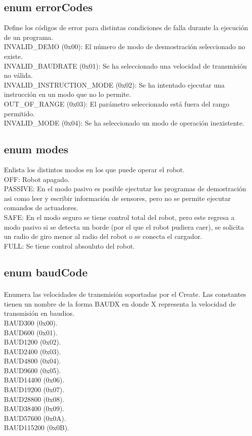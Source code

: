 \documentclass[letterpaper]{book}
\begin{document}
\subsection{enum errorCodes}
Define los códigos de error para distintas condiciones de falla durante la ejecución de un programa.\\
INVALID\_DEMO (0x00): El número de modo de desmostración seleccionado no existe.\\
INVALID\_BAUDRATE (0x01): Se ha seleccionado una velocidad de transmisión no válida.\\
INVALID\_INSTRUCTION\_MODE (0x02): Se ha intentado ejecutar una instrucción en un modo que no lo permite.\\
OUT\_OF\_RANGE (0x03): El parámetro seleccionado está fuera del rango permitido.\\
INVALID\_MODE (0x04): Se ha seleccionado un modo de operación inexistente.\\

\subsection{enum modes}
Enlista los distintos modos en los que puede operar el robot.\\
OFF: Robot apagado.\\
PASSIVE: En el modo pasivo es posible ejectutar los programas de demostración asi como leer y escribir información de sensores, pero no se permite ejecutar comandos de actuadores.\\
SAFE: En el modo seguro se tiene control total del robot, pero este regresa a modo pasivo si se detecta un borde (por el que el robot pudiera caer), se solicita un radio de giro menor al radio del robot o se conecta el cargador.\\
FULL: Se tiene control absouluto del robot.\\
\subsection{enum baudCode}
Enumera las velocidades de transmisión soportadas por el Create\textsuperscript{\textregistered}. Las constantes tienen un nombre de la forma BAUDX en donde X representa la velocidad de transmisión en baudios.\\
BAUD300 (0x00).\\
BAUD600 (0x01).\\
BAUD1200 (0x02).\\
BAUD2400 (0x03).\\
BAUD4800 (0x04).\\
BAUD9600 (0x05).\\
BAUD14400 (0x06).\\
BAUD19200 (0x07).\\
BAUD28800 (0x08).\\
BAUD38400 (0x09).\\
BAUD57600 (0x0A).\\
BAUD115200 (0x0B).\\
\end{document}
